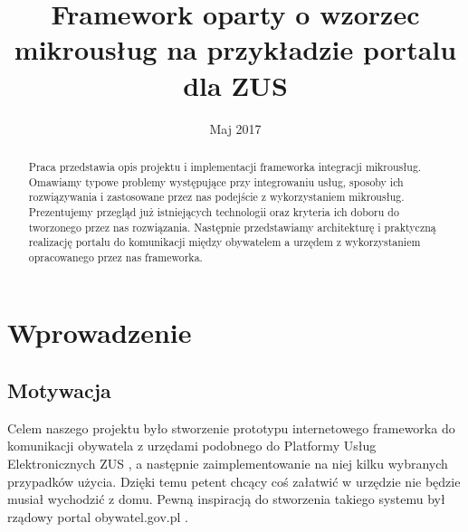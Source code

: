 \documentclass[licencjacka]{pracamgr}
\title{Framework oparty o wzorzec mikrousług na przykładzie portalu dla ZUS}
\date{Maj 2017}
\begin{document}
\maketitle

\begin{abstract}
	Praca przedstawia opis projektu i implementacji frameworka integracji mikrousług.
	Omawiamy typowe problemy występujące przy integrowaniu usług, sposoby ich
	rozwiązywania i zastosowane przez nas podejście z wykorzystaniem mikrousług.
	Prezentujemy przegląd już istniejących technologii oraz kryteria ich doboru
	do tworzonego przez nas rozwiązania. Następnie przedstawiamy architekturę i
	praktyczną realizację portalu do komunikacji między obywatelem a urzędem z
	wykorzystaniem opracowanego przez nas frameworka.
\end{abstract}

\tableofcontents



\chapter{Wprowadzenie}\label{r:wstep}

\section{Motywacja}

Celem naszego projektu było stworzenie prototypu internetowego frameworka do komunikacji obywatela z urzędami
podobnego do Platformy Usług Elektronicznych ZUS \cite{zuspue}, a następnie zaimplementowanie na niej kilku wybranych przypadków użycia. Dzięki temu petent chcący
coś załatwić w urzędzie nie będzie musiał wychodzić z domu. Pewną inspiracją do stworzenia takiego systemu był
rządowy portal obywatel.gov.pl \cite{mcobywatel}.
\end{document}
